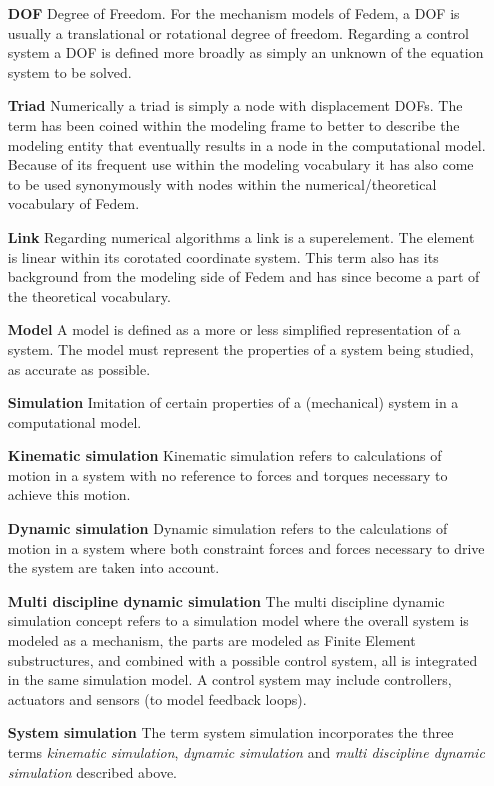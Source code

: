 \begin{itemize}

\item[\bf DOF]
Degree of Freedom. For the mechanism models of Fedem, a DOF is usually a translational
or rotational degree of freedom. Regarding a control system a DOF is defined more broadly as
simply an unknown of the equation system to be solved.

\item[\bf Triad]
Numerically a triad is simply a node with displacement DOFs. The term has
been coined within the modeling frame to better to describe the modeling entity that eventually
results in a node in the computational model. Because of its frequent use within the modeling
vocabulary it has also come to be used synonymously with nodes within the numerical/theoretical
vocabulary of Fedem.

\item[\bf Link]
Regarding numerical algorithms a link is a superelement. The element is linear within
its corotated coordinate system. This term also has its background from the modeling
side of Fedem and has since become a part of the theoretical vocabulary.

\item[\bf Model]
A model is defined as a more or less simplified representation 
of a system. The model must represent the properties of a system being studied,
as accurate as possible.

\item[\bf Simulation]
Imitation of certain properties of a (mechanical) system in a computational model.

\item[\bf Kinematic simulation]
Kinematic simulation refers to calculations of motion in a system 
with no reference to forces and torques necessary to achieve this motion.

\item[\bf Dynamic simulation]
Dynamic simulation refers to the calculations of motion in a system 
where both constraint forces and forces necessary to drive the system are 
taken into account.

\item[\bf Multi discipline dynamic simulation]
The multi discipline dynamic simulation concept refers to a 
simulation model where the overall system is modeled as a mechanism, the 
parts are modeled as Finite Element substructures, and combined with a 
possible control system, all is integrated in the same simulation model.
A control system may include controllers, actuators and sensors (to model feedback loops).

\item[\bf System simulation]
The term system simulation incorporates the three terms 
\textit{kinematic simulation}, \textit{dynamic simulation} and 
\textit{multi discipline dynamic simulation} described above.
\end{itemize}

